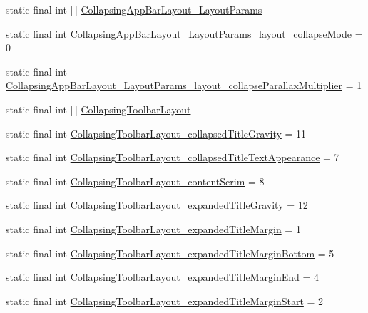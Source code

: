 \begin{DoxyCompactItemize}
\item 
static final int \mbox{[}$\,$\mbox{]} \hyperlink{classproject4_1_1xaria_1_1R_1_1styleable_a22d4439a4550b11fcac1b86a5aaca608}{Collapsing\+App\+Bar\+Layout\+\_\+\+Layout\+Params}
\item 
static final int \hyperlink{classproject4_1_1xaria_1_1R_1_1styleable_ad21b82d63a3f6941c5d827a4ca8d9dc3}{Collapsing\+App\+Bar\+Layout\+\_\+\+Layout\+Params\+\_\+layout\+\_\+collapse\+Mode} = 0
\item 
static final int \hyperlink{classproject4_1_1xaria_1_1R_1_1styleable_a04168d03b2bad3e184b322ab1bb66445}{Collapsing\+App\+Bar\+Layout\+\_\+\+Layout\+Params\+\_\+layout\+\_\+collapse\+Parallax\+Multiplier} = 1
\item 
static final int \mbox{[}$\,$\mbox{]} \hyperlink{classproject4_1_1xaria_1_1R_1_1styleable_ac131ed2b7e0e7f05b58231242478b839}{Collapsing\+Toolbar\+Layout}
\item 
static final int \hyperlink{classproject4_1_1xaria_1_1R_1_1styleable_a15ca5722add659943b94aec2b6f66a19}{Collapsing\+Toolbar\+Layout\+\_\+collapsed\+Title\+Gravity} = 11
\item 
static final int \hyperlink{classproject4_1_1xaria_1_1R_1_1styleable_a5d38cc3ee657b1c221bbd1c59349c1a8}{Collapsing\+Toolbar\+Layout\+\_\+collapsed\+Title\+Text\+Appearance} = 7
\item 
static final int \hyperlink{classproject4_1_1xaria_1_1R_1_1styleable_aafc0ee2f0a373dd6bea4534c79ce24e2}{Collapsing\+Toolbar\+Layout\+\_\+content\+Scrim} = 8
\item 
static final int \hyperlink{classproject4_1_1xaria_1_1R_1_1styleable_a9a4dfbfaf067b89d3e998221b667aae4}{Collapsing\+Toolbar\+Layout\+\_\+expanded\+Title\+Gravity} = 12
\item 
static final int \hyperlink{classproject4_1_1xaria_1_1R_1_1styleable_a32e897c7aed6567462eb91ece9f149d4}{Collapsing\+Toolbar\+Layout\+\_\+expanded\+Title\+Margin} = 1
\item 
static final int \hyperlink{classproject4_1_1xaria_1_1R_1_1styleable_ab15616401f9effe51d0c5ab4df6399a5}{Collapsing\+Toolbar\+Layout\+\_\+expanded\+Title\+Margin\+Bottom} = 5
\item 
static final int \hyperlink{classproject4_1_1xaria_1_1R_1_1styleable_add3700a4da95b0e9fe9cc81beada966b}{Collapsing\+Toolbar\+Layout\+\_\+expanded\+Title\+Margin\+End} = 4
\item 
static final int \hyperlink{classproject4_1_1xaria_1_1R_1_1styleable_a0dbfb6e3b88ea621358c4ea2f5acc61f}{Collapsing\+Toolbar\+Layout\+\_\+expanded\+Title\+Margin\+Start} = 2

\end{DoxyCompactItemize}
